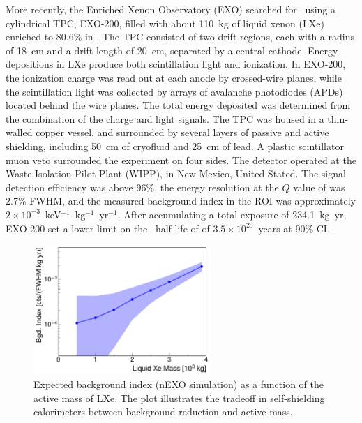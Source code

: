 More recently, the Enriched Xenon Observatory (EXO) searched for \bbonu\ using a cylindrical TPC, EXO-200, filled with about 110~kg of liquid xenon (LXe) enriched to 80.6\% in  \cite{EXO-200:2019rkq}. The TPC consisted of two drift regions, each with a radius of 18~cm and a drift length of 20~cm, separated by a central cathode. Energy depositions in LXe produce both scintillation light and ionization. In EXO-200, the ionization charge was read out at each anode by crossed-wire planes, while the scintillation light was collected by arrays of avalanche photodiodes (APDs) located behind the wire planes. The total energy deposited was determined from the combination of the charge and light signals. The TPC was housed in a thin-walled copper vessel, and surrounded by several layers of passive and active shielding, including 50~cm of cryofluid and 25~cm of lead. A plastic scintillator muon veto surrounded the experiment on four sides. The detector operated at the Waste Isolation Pilot Plant (WIPP), in New Mexico, United Stated. The signal detection efficiency was above 96\%, the energy resolution at the $Q$ value of  was 2.7\% FWHM, and the measured background index in the ROI was approximately $2\times10^{-3}$~keV$^{-1}$~kg$^{-1}$~yr$^{-1}$. After accumulating a total exposure of 234.1~kg~yr, EXO-200 set a lower limit on the \bbonu\ half-life of  of $3.5\times10^{25}$~years at 90\% CL.

\begin{figure}[tb]
\centering
\includegraphics[width=0.6\textwidth]{img/nexo}
\caption{Expected background index (nEXO simulation) as a function of the active mass of LXe. The plot illustrates the tradeoff in self-shielding calorimeters between background reduction and active mass.} \label{fig:nexo}
\end{figure}

